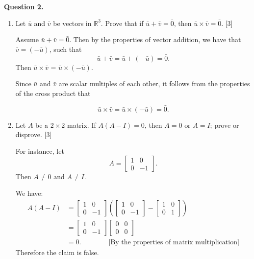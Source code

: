 \documentclass[11pt]{article}
\begin{document}
\newpage

\textbf{Question 2.}
\begin{enumerate}[label=\alph*)]
    \item Let \(\bar{u}\) and \(\bar{v}\) be vectors in \(\mathbb{R}^3\). Prove that if \(\bar{u}+\bar{v} = \bar{0}\), then \(\bar{u}\times\bar{v} = \bar{0}\). \hfill [3]
    
    \color{blue}
    Assume \(\bar{u}+\bar{v} = \bar{0}\). Then by the properties of vector addition, we have that \(\bar{v} = (-\bar{u})\), such that
    \[
        \bar{u} + \bar{v} = \bar{u} + (-\bar{u}) = \bar{0}.
    \]
    Then \(\bar{u}\times\bar{v}\) = \(\bar{u}\times(-\bar{u})\).

    Since \(\bar{u}\) and \(\bar{v}\) are scalar multiples of each other, it follows from the properties of the cross product that

    \[
            \bar{u}\times\bar{v} = \bar{u}\times(-\bar{u}) = \bar{0}.    
    \]
    \color{black}
    \item Let \(A\) be a \(2\times2\) matrix. If \(A(A-I) = 0\), then \(A = 0 \text{ or } A = I\); prove or disprove. \hfill [3]
    
    \color{blue}
    For instance, let
    \[
        A = \begin{bmatrix}
            1 & 0\\
            0 & -1
        \end{bmatrix}.
    \]
    Then \(A \neq 0 \text{ and } A \neq I\).

    We have:
        \[
        \begin{aligned}
            A(A-I) &= \begin{bmatrix}
            1 & 0\\
            0 & -1
        \end{bmatrix}
        \left(\begin{bmatrix}
            1 & 0\\
            0 & -1
        \end{bmatrix} - \begin{bmatrix}
            1 & 0\\
            0 & 1
        \end{bmatrix}\right)\\  
        &=\begin{bmatrix}
            1 & 0\\
            0 & -1
        \end{bmatrix}\begin{bmatrix}
            0 & 0\\
            0 & 0
        \end{bmatrix}\\
        &= 0.  \qquad \qquad \text{[By the properties of matrix multiplication]}
        \end{aligned} 
    \]
    Therefore the claim is false.


\end{enumerate}
\end{document}
